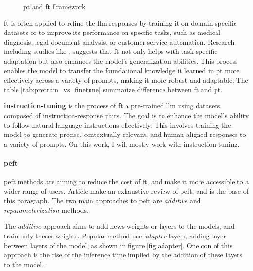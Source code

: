 \begin{figure}[h]
    \centering
    
    \caption{\Gls{pt} and \Gls{ft} Framework}
    \label{fig:pretrain_finetune}
\end{figure}

\Gls{ft} is often applied to refine the \acrshort{llm} responses by training it on domain-specific datasets or to improve its performance on specific tasks, such as medical diagnosis, legal document analysis, or customer service automation. Research, including studies like \cite{wei_finetuned_2022}, suggests that \gls{ft} not only helps with task-specific adaptation but also enhances the model's generalization abilities. This process enables the model to transfer the foundational knowledge it learned in \gls{pt} more effectively across a variety of prompts, making it more robust and adaptable. The table \ref{tab:pretrain_vs_finetune} summarize difference between \gls{ft} and \gls{pt}.



\textbf{\Gls{instruction-tuning}} is the process of \gls{ft} a pre-trained \acrshort{llm} using datasets composed of instruction-response pairs. The goal is to enhance the model's ability to follow natural language instructions effectively. This involves training the model to generate precise, contextually relevant, and human-aligned responses to a variety of prompts. On this work, I will mostly work with \gls{instruction-tuning}.

\paragraph{\gls{peft}}

\gls{peft} methods are aiming to reduce the cost of \gls{ft}, and make it more accessible to a wider range of users. Article \cite{han_parameter-efficient_2024} make an exhaustive review of \acrshort{peft}, and is the base of this paragraph. The two main approaches to \acrshort{peft} are \textit{additive} and \textit{reparameterization} methods.

The \textit{additive} approach aims to add news weights or layers to the models, and train only theses weights. Popular method  use \textit{adapter} layers, adding layer between layers of the model, as shown in figure \ref{fig:adapter}. One con of this approach is the rise of the inference time implied by the addition of these layers to the model.


